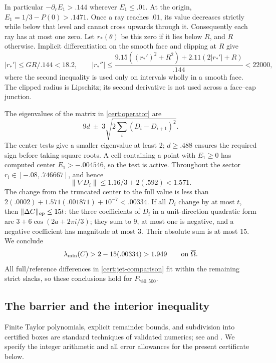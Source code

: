 In particular $-\partial_rE_1>.144$ wherever $E_1\leq.01$.  At the origin,
$E_1=1/3-P(0)>.1471$.  Once a ray reaches $.01$, its value decreases
strictly while below that level and cannot cross upwards through it.
Consequently each ray has at most one zero.  Let $r_*(\theta)$ be this zero
if it lies below $R$, and $R$ otherwise.  Implicit differentiation on the
smooth face and clipping at $R$ give
\begin{equation}\label{cert:boundary-coarse}
 |r_*'|\leq GR/.144<18.2,\qquad
 |r_*''|\leq\frac{9.15((r_*')^2+R^2)+2.11(2|r_*'|+R)}{.144}<22000,
\end{equation}
where the second inequality is used only on intervals wholly in a smooth
face.  The clipped radius is Lipschitz; its second derivative is not used
across a face--cap junction.

The eigenvalues of the matrix in \eqref{cert:operator} are
\[
 9d\ \pm\ 3\sqrt{2\sum_i(D_i-D_{i+1})^2}.
\]
The center tests give a smaller eigenvalue at least 2; $d\geq.488$ ensures
the required sign before taking square roots.  A cell containing a point
with $E_1\geq0$ has computed center $E_1>-.004546$, so the test is active.
Throughout the sector $r_i\in[-.08,.746667]$, and hence
\[
 \|\nabla D_i\|\leq1.16/3+2(.592)<1.571.
\]
The change from the truncated center to the full value is less than
$2(.0002)+1.571(.001871)+10^{-7}<.00334$.  If all $D_i$ change by at most
$t$, then $\|\Delta C\|_{\rm op}\leq15t$: the three coefficients of $D_i$
in a unit-direction quadratic form are $3+6\cos(2a+2\pi i/3)$; they sum to
9, at most one is negative, and a negative coefficient has magnitude at
most 3.  Their absolute sum is at most 15.  We conclude
\begin{equation}\label{cert:ellipticity}
 \lambda_{\min}(C)>2-15(.00334)>1.949\qquad\hbox{on }\overline\Omega.
\end{equation}
All full/reference differences in \eqref{cert:jet-comparison} fit within
the remaining strict slacks, so these conclusions hold for $P_{780,500}$.

\subsection{The barrier and the interior inequality}
\label{cert:interior}

Finite Taylor polynomials, explicit remainder bounds, and subdivision
into certified boxes are standard techniques of validated numerics; see
\cite[Section~2 and Algorithm~1]{makinoberz2003} and
\cite[Section~2]{solovyevhales2013}.  We specify the integer
arithmetic and all error allowances for the present certificate below.

